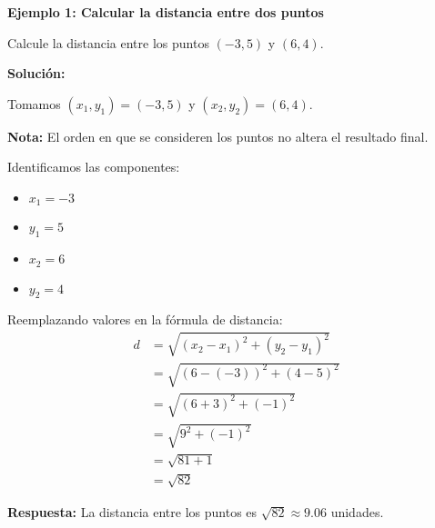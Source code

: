 \begin{example}
\textbf{Ejemplo 1: Calcular la distancia entre dos puntos}

Calcule la distancia entre los puntos $(-3, 5)$ y $(6, 4)$.

\textbf{Solución:}

Tomamos $(x_1, y_1) = (-3, 5)$ y $(x_2, y_2) = (6, 4)$.

\textbf{Nota:} El orden en que se consideren los puntos no altera el resultado final.

Identificamos las componentes:
\begin{itemize}
    \item $x_1 = -3$
    \item $y_1 = 5$
    \item $x_2 = 6$
    \item $y_2 = 4$
\end{itemize}

Reemplazando valores en la fórmula de distancia:
\begin{align*}
d &= \sqrt{(x_2 - x_1)^2 + (y_2 - y_1)^2} \\
  &= \sqrt{(6 - (-3))^2 + (4 - 5)^2} \\
  &= \sqrt{(6 + 3)^2 + (-1)^2} \\
  &= \sqrt{9^2 + (-1)^2} \\
  &= \sqrt{81 + 1} \\
  &= \sqrt{82}
\end{align*}

\textbf{Respuesta:} La distancia entre los puntos es $\sqrt{82} \approx 9.06$ unidades.
\end{example}

\begin{center}
\end{center}

